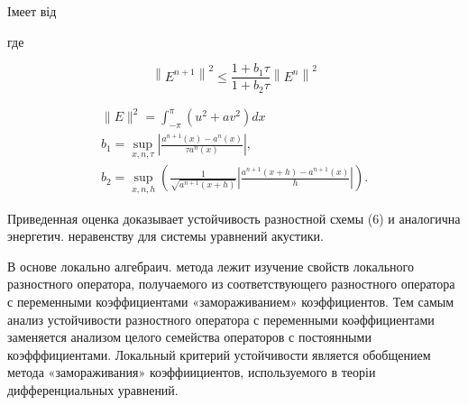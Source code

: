 \documentclass[10pt]{article}
\begin{document}
Імеет від



где



\[

\left\|E^{n+1}\right\|^{2} \leqslant \frac{1+b_{1} \tau}{1+b_{2} \tau}\left\|E^{n}\right\|^{2}

\]



\[

\begin{gathered}

\|E\|^{2}=\int_{-\pi}^{\pi}\left(u^{2}+a v^{2}\right) d x \\

b_{1}=\sup _{x, n, \tau}\left|\frac{a^{n+1}(x)-a^{n}(x)}{\tau a^{n}(x)}\right|, \\

b_{2}=\sup _{x, n, h}\left(\frac{1}{\sqrt{a^{n+1}(x+h)}}\left|\frac{a^{n+1}(x+h)-a^{n+1}(x)}{h}\right|\right) .

\end{gathered}

\]



Приведенная оценка доказывает устойчивость разностной схемы (6) и аналогична энергетич. неравенству для системы уравнений акустики.



В основе локально алгебраич. метода лежит изучение свойств локального разностного оператора, получаемого из соответствующего разностного оператора с переменными коэффициентами «замораживанием» коэффициентов. Тем самым анализ устойчивости разностного оператора с переменными коәффициентами заменяется анализом целого семейства операторов с постоянными коэфффициентами. Локальный критерий устойчивости является обобщением метода «замораживания» коэффиициентов, используемого в теоріи дифференциальных уравнений.
\end{document}
